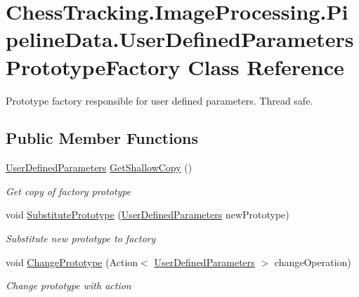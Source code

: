 \hypertarget{class_chess_tracking_1_1_image_processing_1_1_pipeline_data_1_1_user_defined_parameters_prototype_factory}{}\section{Chess\+Tracking.\+Image\+Processing.\+Pipeline\+Data.\+User\+Defined\+Parameters\+Prototype\+Factory Class Reference}
\label{class_chess_tracking_1_1_image_processing_1_1_pipeline_data_1_1_user_defined_parameters_prototype_factory}


Prototype factory responsible for user defined parameters. Thread safe.  


\subsection*{Public Member Functions}
\begin{DoxyCompactItemize}
\item 
\mbox{\hyperlink{class_chess_tracking_1_1_image_processing_1_1_pipeline_data_1_1_user_defined_parameters}{User\+Defined\+Parameters}} \mbox{\hyperlink{class_chess_tracking_1_1_image_processing_1_1_pipeline_data_1_1_user_defined_parameters_prototype_factory_a84477bd0080d652ac6c01620e413de7c}{Get\+Shallow\+Copy}} ()
\begin{DoxyCompactList}\small\item\em Get copy of factory prototype \end{DoxyCompactList}\item 
void \mbox{\hyperlink{class_chess_tracking_1_1_image_processing_1_1_pipeline_data_1_1_user_defined_parameters_prototype_factory_a606ba0c77d7f0c86490924598e123d3a}{Substitute\+Prototype}} (\mbox{\hyperlink{class_chess_tracking_1_1_image_processing_1_1_pipeline_data_1_1_user_defined_parameters}{User\+Defined\+Parameters}} new\+Prototype)
\begin{DoxyCompactList}\small\item\em Substitute new prototype to factory \end{DoxyCompactList}\item 
void \mbox{\hyperlink{class_chess_tracking_1_1_image_processing_1_1_pipeline_data_1_1_user_defined_parameters_prototype_factory_a1069fa2869311752f46057cf5c2dca6b}{Change\+Prototype}} (Action$<$ \mbox{\hyperlink{class_chess_tracking_1_1_image_processing_1_1_pipeline_data_1_1_user_defined_parameters}{User\+Defined\+Parameters}} $>$ change\+Operation)
\begin{DoxyCompactList}\small\item\em Change prototype with action \end{DoxyCompactList}\end{DoxyCompactItemize}
